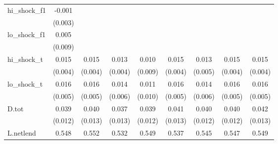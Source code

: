 {\begin{tabular}{l*{8}{c}}
\addlinespace
hi\_shock\_f1 &      -0.001         &                     &                     &                     &                     &                     &                     &                     \\
            &     (0.003)         &                     &                     &                     &                     &                     &                     &                     \\
\addlinespace
lo\_shock\_f1 &       0.005         &                     &                     &                     &                     &                     &                     &                     \\
            &     (0.009)         &                     &                     &                     &                     &                     &                     &                     \\
\addlinespace
hi\_shock\_t  &       0.015\sym{***}&       0.015\sym{***}&       0.013\sym{***}&       0.010         &       0.015\sym{***}&       0.013\sym{***}&       0.015\sym{***}&       0.015\sym{***}\\
            &     (0.004)         &     (0.004)         &     (0.004)         &     (0.009)         &     (0.004)         &     (0.005)         &     (0.004)         &     (0.004)         \\
\addlinespace
lo\_shock\_t  &       0.016\sym{***}&       0.016\sym{***}&       0.014\sym{**} &       0.011         &       0.016\sym{***}&       0.014\sym{**} &       0.016\sym{***}&       0.016\sym{***}\\
            &     (0.005)         &     (0.005)         &     (0.006)         &     (0.010)         &     (0.005)         &     (0.006)         &     (0.005)         &     (0.005)         \\
\addlinespace
D.tot       &       0.039\sym{***}&       0.040\sym{***}&       0.037\sym{***}&       0.039\sym{***}&       0.041\sym{***}&       0.040\sym{***}&       0.040\sym{***}&       0.042\sym{***}\\
            &     (0.012)         &     (0.013)         &     (0.013)         &     (0.012)         &     (0.013)         &     (0.012)         &     (0.012)         &     (0.013)         \\
\addlinespace
L.netlend   &       0.548\sym{***}&       0.552\sym{***}&       0.532\sym{***}&       0.549\sym{***}&       0.537\sym{***}&       0.545\sym{***}&       0.547\sym{***}&       0.549\sym{***}\\

\end{tabular}}
